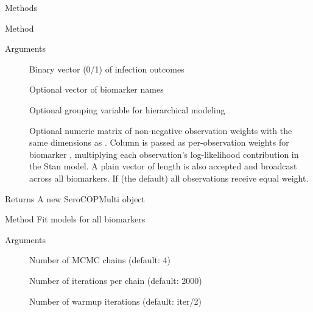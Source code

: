 \documentclass[a4paper]{book}
\begin{document}
\begin{Section}{Methods}
\begin{SubSection}{Method }
\begin{SubSubSection}{Arguments}
\begin{description}
\item[] Binary vector (0/1) of infection outcomes

\item[] Optional vector of biomarker names

\item[] Optional grouping variable for hierarchical modeling

\item[] Optional numeric matrix of non-negative observation weights with
the same dimensions as . Column  is passed as per-observation
weights for biomarker , multiplying each observation's log-likelihood
contribution in the Stan model. A plain vector of length  is
also accepted and broadcast across all biomarkers.
If  (the default) all observations receive equal weight.

\end{description}


\end{SubSubSection}

%
\begin{SubSubSection}{Returns}
A new SeroCOPMulti object
\end{SubSubSection}

\end{SubSection}



\hypertarget{method-SeroCOPMulti-fit_all}{}
%
\begin{SubSection}{Method }
Fit models for all biomarkers
%


%
\begin{SubSubSection}{Arguments}

\begin{description}

\item[] Number of MCMC chains (default: 4)

\item[] Number of iterations per chain (default: 2000)

\item[] Number of warmup iterations (default: iter/2)


\end{description}
\end{SubSubSection}
\end{SubSection}
\end{Section}
\end{document}
